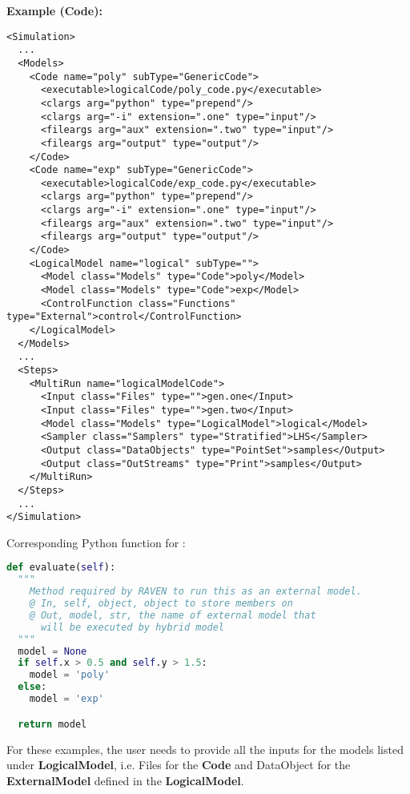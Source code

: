 \textbf{Example (Code):}
\begin{lstlisting}[style=XML,morekeywords={subType,debug,repeat,name,class,type}]
<Simulation>
  ...
  <Models>
    <Code name="poly" subType="GenericCode">
      <executable>logicalCode/poly_code.py</executable>
      <clargs arg="python" type="prepend"/>
      <clargs arg="-i" extension=".one" type="input"/>
      <fileargs arg="aux" extension=".two" type="input"/>
      <fileargs arg="output" type="output"/>
    </Code>
    <Code name="exp" subType="GenericCode">
      <executable>logicalCode/exp_code.py</executable>
      <clargs arg="python" type="prepend"/>
      <clargs arg="-i" extension=".one" type="input"/>
      <fileargs arg="aux" extension=".two" type="input"/>
      <fileargs arg="output" type="output"/>
    </Code>
    <LogicalModel name="logical" subType="">
      <Model class="Models" type="Code">poly</Model>
      <Model class="Models" type="Code">exp</Model>
      <ControlFunction class="Functions" type="External">control</ControlFunction>
    </LogicalModel>
  </Models>
  ...
  <Steps>
    <MultiRun name="logicalModelCode">
      <Input class="Files" type="">gen.one</Input>
      <Input class="Files" type="">gen.two</Input>
      <Model class="Models" type="LogicalModel">logical</Model>
      <Sampler class="Samplers" type="Stratified">LHS</Sampler>
      <Output class="DataObjects" type="PointSet">samples</Output>
      <Output class="OutStreams" type="Print">samples</Output>
    </MultiRun>
  </Steps>
  ...
</Simulation>
\end{lstlisting}

Corresponding Python function for :
\begin{lstlisting}[language=python]
def evaluate(self):
  """
    Method required by RAVEN to run this as an external model.
    @ In, self, object, object to store members on
    @ Out, model, str, the name of external model that
      will be executed by hybrid model
  """
  model = None
  if self.x > 0.5 and self.y > 1.5:
    model = 'poly'
  else:
    model = 'exp'

  return model
\end{lstlisting}
%
\nb For these examples, the user needs to provide all the inputs for the models listed
under \textbf{LogicalModel}, i.e. Files for the \textbf{Code} and DataObject for
the \textbf{ExternalModel} defined in the \textbf{LogicalModel}.
